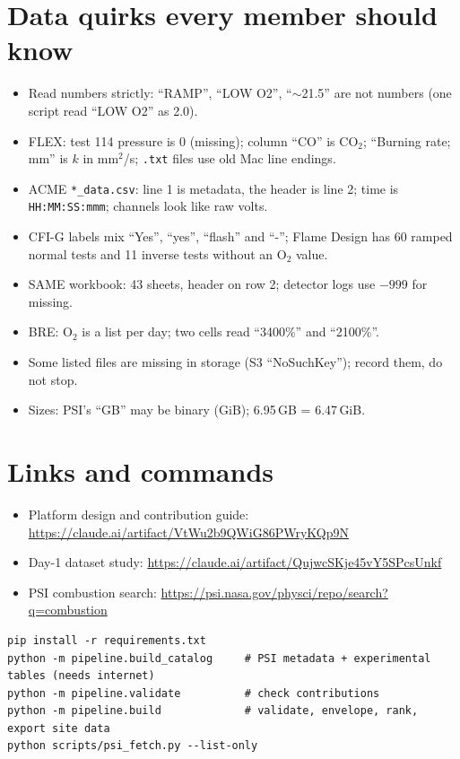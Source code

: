 \documentclass[10pt,a4paper]{article}
\newcommand{\file}[1]{\nolinkurl{#1}}
\begin{document}
\section{Data quirks every member should know}
\begin{itemize}
\item Read numbers strictly: ``RAMP'', ``LOW O2'', ``$\sim$21.5'' are not numbers (one script read ``LOW O2'' as 2.0).
\item FLEX: test 114 pressure is 0 (missing); column ``CO'' is CO$_2$; ``Burning rate; mm'' is $k$ in mm$^2$/s; \file{.txt} files use old Mac line endings.
\item ACME \file{*_data.csv}: line 1 is metadata, the header is line 2; time is \texttt{HH:MM:SS:mmm}; channels look like raw volts.
\item CFI-G labels mix ``Yes'', ``yes'', ``flash'' and ``-''; Flame Design has 60 ramped normal tests and 11 inverse tests without an O$_2$ value.
\item SAME workbook: 43 sheets, header on row 2; detector logs use $-999$ for missing.
\item BRE: O$_2$ is a list per day; two cells read ``3400\%'' and ``2100\%''.
\item Some listed files are missing in storage (S3 ``NoSuchKey''); record them, do not stop.
\item Sizes: PSI's ``GB'' may be binary (GiB); 6.95\,GB = 6.47\,GiB.
\end{itemize}

\section{Links and commands}
\begin{itemize}
\item Platform design and contribution guide: \url{https://claude.ai/artifact/VtWu2b9QWiG86PWryKQp9N}
\item Day-1 dataset study: \url{https://claude.ai/artifact/QujwcSKje45vY5SPcsUnkf}
\item PSI combustion search: \url{https://psi.nasa.gov/physci/repo/search?q=combustion}
\end{itemize}
\begin{verbatim}
pip install -r requirements.txt
python -m pipeline.build_catalog     # PSI metadata + experimental tables (needs internet)
python -m pipeline.validate          # check contributions
python -m pipeline.build             # validate, envelope, rank, export site data
python scripts/psi_fetch.py --list-only
\end{verbatim}
\end{document}
